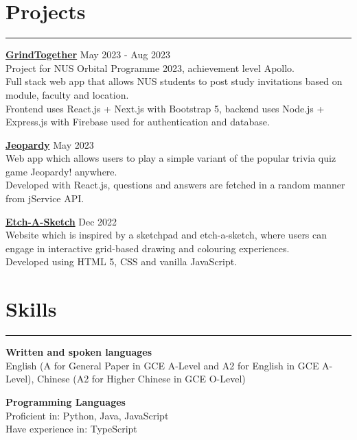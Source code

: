 \documentclass[letterpaper,11pt]{article}
\begin{document}
     
    \section{Projects}
    \vspace{-0.5em}
    \hrule
    \vspace{0.5em}
    \textbf{\href {https://github.com/McNaBry/orbital-grindtogether}{GrindTogether}} \hfill May 2023
    - Aug 2023
    \\
    Project for NUS Orbital Programme 2023, achievement level Apollo.
    \\
    Full stack web app that allows NUS students to post study invitations based on module, faculty 
    and location. 
    \\
    Frontend uses React.js + Next.js with Bootstrap 5, backend uses Node.js + Express.js with 
    Firebase used for authentication and database.
     

    \vspace{0.5em}
    \textbf{\href {https://github.com/tjch-o/jeopardy}{Jeopardy}} \hfill May 2023
    \\
    Web app which allows users to play a simple variant of the popular trivia quiz game Jeopardy! 
    anywhere.
    \\
    Developed with React.js, questions and answers are fetched in a random manner from jService API.

    \vspace{0.5em}
    \textbf{\href {https://github.com/tjch-o/the-odin-project/tree/main/odin-etch-a-sketch}
    {Etch-A-Sketch}} \hfill Dec 2022
    \\
    Website which is inspired by a sketchpad and etch-a-sketch, where users can engage in interactive 
    grid-based drawing and colouring experiences.
    \\ 
    Developed using HTML 5, CSS and vanilla JavaScript.
     
    \section{Skills}
    \vspace{-0.5em}
    \hrule 
    \vspace{0.5em}
    \textbf{Written and spoken languages} 
    \\
    English (A for General Paper in GCE A-Level and A2 for English in GCE A-Level), Chinese (A2 for 
    Higher Chinese in GCE O-Level)

    \vspace{0.5em}
    \textbf{Programming Languages}
    \\
    Proficient in: Python, Java, JavaScript
    \\
    Have experience in: TypeScript
\end{document}
